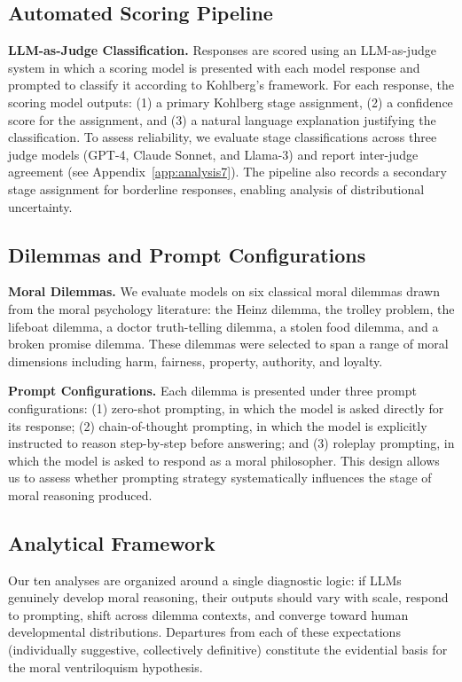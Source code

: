 \documentclass{article}
\begin{document}
\subsection{Automated Scoring Pipeline}

\textbf{LLM-as-Judge Classification.} Responses are scored using an LLM-as-judge system in which a scoring model is presented with each model response and prompted to classify it according to Kohlberg's framework. For each response, the scoring model outputs: (1) a primary Kohlberg stage assignment, (2) a confidence score for the assignment, and (3) a natural language explanation justifying the classification. To assess reliability, we evaluate stage classifications across three judge models (GPT-4, Claude Sonnet, and Llama-3) and report inter-judge agreement (see Appendix~\ref{app:analysis7}). The pipeline also records a secondary stage assignment for borderline responses, enabling analysis of distributional uncertainty.

\subsection{Dilemmas and Prompt Configurations}

\textbf{Moral Dilemmas.} We evaluate models on six classical moral dilemmas drawn from the moral psychology literature: the Heinz dilemma, the trolley problem, the lifeboat dilemma, a doctor truth-telling dilemma, a stolen food dilemma, and a broken promise dilemma. These dilemmas were selected to span a range of moral dimensions including harm, fairness, property, authority, and loyalty.

\textbf{Prompt Configurations.} Each dilemma is presented under three prompt configurations: (1) zero-shot prompting, in which the model is asked directly for its response; (2) chain-of-thought prompting, in which the model is explicitly instructed to reason step-by-step before answering; and (3) roleplay prompting, in which the model is asked to respond as a moral philosopher. This design allows us to assess whether prompting strategy systematically influences the stage of moral reasoning produced.

\subsection{Analytical Framework}

Our ten analyses are organized around a single diagnostic logic: if LLMs genuinely develop moral reasoning, their outputs should vary with scale, respond to prompting, shift across dilemma contexts, and converge toward human developmental distributions. Departures from each of these expectations (individually suggestive, collectively definitive) constitute the evidential basis for the moral ventriloquism hypothesis.
\end{document}
